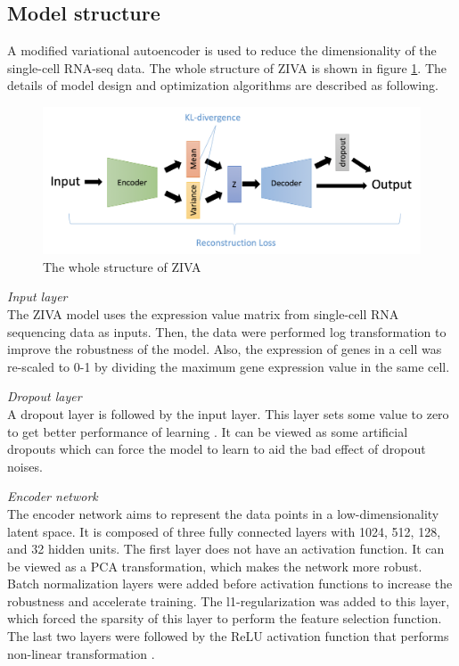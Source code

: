 \subsection{Model structure}
A modified variational autoencoder \cite{Kingma2014} is used to reduce the dimensionality of the single-cell RNA-seq data. The whole structure of ZIVA is shown in figure \ref{modelstru}. The details of model design and optimization algorithms are described as following. 
\begin{figure}[htb!]
    \centering
    \includegraphics[width=1\textwidth]{figures/myfigures/ZIVA.png}
    \caption{The whole structure of ZIVA}
    \label{modelstru}
\end{figure}

\vspace{0.5cm}
\noindent\emph{Input layer} \\ The ZIVA model uses the expression value matrix from single-cell RNA sequencing data as inputs. Then, the data were performed log transformation to improve the robustness of the model.  Also, the expression of genes in a cell was re-scaled to 0-1 by dividing the maximum gene expression value in the same cell. 

\vspace{0.5cm}
\noindent\emph{Dropout layer} \\ A dropout layer \cite{baldi2013understanding} is followed by the input layer. This layer sets some value to zero to get better performance of learning \cite{vincent2008extracting}. It can be viewed as some artificial dropouts which can force the model to learn to aid the bad effect of dropout noises. 

\vspace{0.5cm}
\noindent\emph{Encoder network} \\
The encoder network aims to represent the data points in a low-dimensionality latent space. It is composed of three fully connected layers with 1024, 512, 128, and 32 hidden units. The first layer does not have an activation function. It can be viewed as a PCA transformation, which makes the network more robust. Batch normalization \cite{ioffe2015batch} layers were added before activation functions to increase the robustness and accelerate training. The l1-regularization was added to this layer, which forced the sparsity of this layer to perform the feature selection function. The last two layers were followed by the ReLU activation function that performs non-linear transformation \cite{krizhevsky2012imagenet}.

